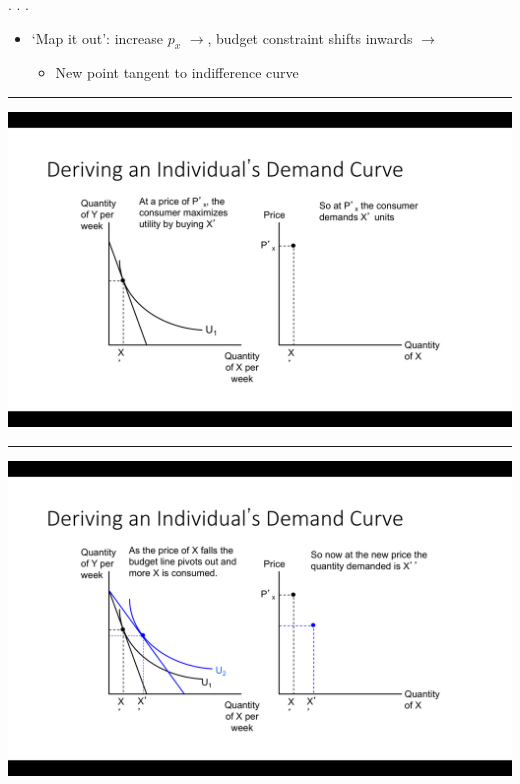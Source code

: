 \documentclass[]{article}
\providecommand{\tightlist}{%
  \setlength{\itemsep}{0pt}\setlength{\parskip}{0pt}}
\begin{document}
. . .

\begin{itemize}
\tightlist
\item
  `Map it out': increase \(p_x\) \(\rightarrow\), budget constraint
  shifts inwards \(\rightarrow\)

  \begin{itemize}
  \tightlist
  \item
    New point tangent to indifference curve
  \end{itemize}
\end{itemize}

\begin{center}\rule{0.5\linewidth}{\linethickness}\end{center}

\includegraphics{picsfigs/dmd1.png}\\

\begin{center}\rule{0.5\linewidth}{\linethickness}\end{center}

\includegraphics{picsfigs/dmd2.png}\\
\end{document}
